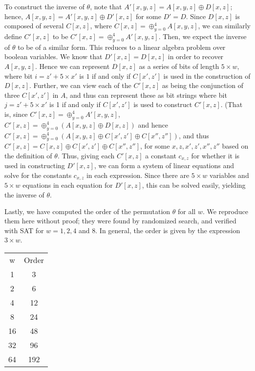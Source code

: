 \documentclass[10pt,twocolumn,twoside]{pnas-new}
\begin{document}
To construct the inverse of $\theta$, note that
$A'[x, y, z] = A[x, y, z] \oplus D[x, z]$; hence,
$A[x, y, z] = A'[x, y, z] \oplus D'[x, z]$ for some $D' = D$. Since $D[x, z]$
is composed of several $C[x, z]$, where
$C[x, z] = \oplus_{y = 0}^{4} A[x, y, z]$, we can similarly define $C'[x, z]$
to be $C'[x, z] = \oplus_{y = 0}^{4} A'[x, y, z]$. Then, we expect the inverse
of $\theta$ to be of a similar form. This reduces to a linear algebra problem
over boolean variables. We know that $D'[x, z] = D[x, z]$ in order to recover
$A[x, y, z]$. Hence we can represent $D[x, z]$ as a series of bits of length
$5 \times w$, where bit $i = z' + 5 \times x'$ is $1$ if and only if
$C[x', z']$ is used in the construction of $D[x, z]$. Further, we can view each
of the $C'[x, z]$ as being the conjunction of three $C[x', z']$ in $A$, and thus
can represent these as bit strings where bit $j = z' + 5\times x'$ is 1 if
and only if $C[x', z']$ is used to construct $C'[x, z]$. (That is,
since $C'[x, z] = \oplus_{y = 0}^{4} A'[x, y, z]$,
$C'[x, z] = \oplus_{y = 0}^{4} (A[x, y, z] \oplus D[x, z])$ and hence
$C'[x, z] = \oplus_{y = 0}^{4} (A[x, y, z] \oplus C[x', z'] \oplus C[x'', z''])$,
and thus $C'[x, z] = C[x, z] \oplus C[x', z'] \oplus C[x'', z'']$, for some
$x, z, x', z', x'', z''$ based on the definition of $\theta$. Thus,
giving each $C'[x, z]$ a constant $c_{x,z}$ for whether it is used in constructing
$D'[x, z]$, we can form a system of linear equations and solve for the
constants $c_{x, z}$ in each expression. Since there are $5 \times w$ variables
and $5 \times w$ equations in each equation for $D'[x, z]$, this can be solved
easily, yielding the inverse of $\theta$.


Lastly, we have computed the order of the permutation $\theta$ for all $w$.
We reproduce them here without proof; they were found by randomized search, and
verified with SAT for $w = 1, 2, 4$ and $8$. In general, the order is given by
the expression $3 \times w$.

\begin{tabular}{c c} \label{tab:p:t:1}
    w & Order \\
    1 & 3 \\
    2 & 6 \\
    4 & 12 \\
    8 & 24 \\
    16 & 48 \\
    32 & 96 \\
    64 & 192 \\
\end{tabular}
\end{document}
